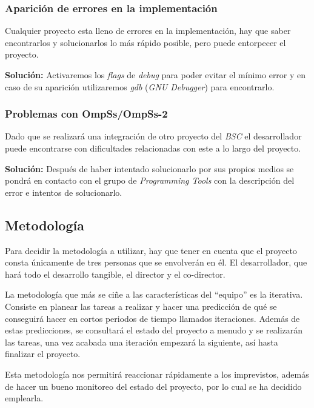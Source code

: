 \subsubsection{Aparición de errores en la implementación}

Cualquier proyecto esta lleno de errores en la implementación, hay que saber encontrarlos y solucionarlos lo más rápido posible, pero puede entorpecer el proyecto.
\par\medskip

\textbf{Solución:} Activaremos los \textit{flags} de \textit{debug} para poder evitar el mínimo error y en caso de su aparición utilizaremos \textit{gdb} (\textit{GNU Debugger}) para encontrarlo.

\subsubsection{Problemas con OmpSs/OmpSs-2}

Dado que se realizará una integración de otro proyecto del \textit{BSC} el desarrollador puede encontrarse con dificultades relacionadas con este a lo largo del proyecto.
\par\medskip

\textbf{Solución:} Después de haber intentado solucionarlo por sus propios medios se pondrá en contacto con el grupo de \textit{Programming Tools} con la descripción del error e intentos de solucionarlo.

\subsection{Metodología}

Para decidir la metodología a utilizar, hay que tener en cuenta que el proyecto consta únicamente de tres personas que se envolverán en él. El desarrollador, que hará todo el desarrollo tangible, el director y el co-director. 
\par\bigskip

La metodología que más se ciñe a las características del ``equipo'' es la iterativa. Consiste en planear las tareas a realizar y hacer una predicción de qué se conseguirá hacer en cortos periodos de tiempo llamados iteraciones. Además de estas predicciones, se consultará el estado del proyecto a menudo y se realizarán las tareas, una vez acabada una iteración empezará la siguiente, así hasta finalizar el proyecto.
\par\bigskip
Esta metodología nos permitirá reaccionar rápidamente a los imprevistos, además de hacer un bueno monitoreo del estado del proyecto, por lo cual se ha decidido emplearla.


